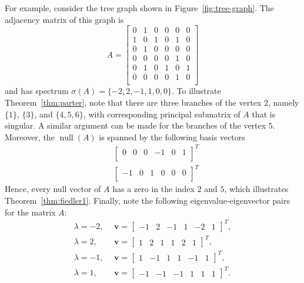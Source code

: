 \documentclass{article}
\theoremstyle{definition}
\newcommand\kernel[1]{\operatorname{null}\left(#1\right)}
\begin{document}
For example, consider the tree graph shown in Figure~\ref{fig:tree-graph}.
The adjacency matrix of this graph is
\[
A = \begin{bmatrix}
	0 & 1 & 0 & 0  & 0 & 0 \\
	1 & 0 & 1 & 0 & 1 & 0 \\
	0 & 1 & 0 & 0 & 0 & 0 \\
	0 & 0 & 0 & 0 & 1 & 0 \\
	0 & 1 & 0 & 1 & 0 & 1 \\
	0 & 0 & 0 & 0 & 1 & 0 \\
	\end{bmatrix}
\]
and has spectrum $\sigma(A) = \{-2,2,-1,1,0,0\}$. 
To illustrate Theorem~\ref{thm:parter}, note that there are three branches of the vertex $2$, namely $\{1\}$, $\{3\}$, and $\{4,5,6\}$, with corresponding principal submatrix of $A$ that is singular. 
A similar argument can be made for the branches of the vertex $5$.
Moreover, the $\kernel{A}$ is spanned by the following basis vectors
\begin{align*}
&
\begin{bmatrix}
0 & 0 & 0 & -1 & 0 & 1 \\
\end{bmatrix}^{T}
\\
&
\begin{bmatrix}
-1 & 0 & 1 & 0 & 0 & 0 \\
\end{bmatrix}^{T}
\end{align*}
Hence, every null vector of $A$ has a zero in the index $2$ and $5$, which illustrates Theorem~\ref{thm:fiedler1}.
Finally, note the following eigenvalue-eigenvector pairs for the matrix $A$:
\begin{align*}
\lambda = -2,~&~\textbf{v} = \begin{bmatrix}-1 & 2 & -1 & 1 & -2 & 1 \end{bmatrix}^{T}, \\
\lambda = 2,~&~\textbf{v} = \begin{bmatrix} 1 & 2 & 1 & 1 & 2 & 1 \end{bmatrix}^{T}, \\
\lambda = -1,~&~\textbf{v} = \begin{bmatrix} 1 & -1 & 1 & 1 & -1 & 1 \end{bmatrix}^{T}, \\
\lambda = 1,~&~\textbf{v} = \begin{bmatrix} -1 & -1 & -1 & 1 & 1 & 1 \end{bmatrix}^{T}. \\
\end{align*}
\end{document}
